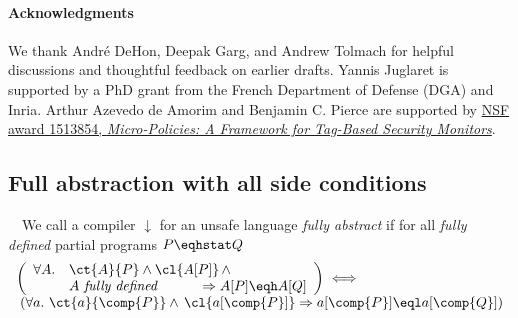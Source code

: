 \documentclass[10pt, conference, compsocconf, letterpaper, times]{IEEEtran}
\begin{document}
\ifanon\else
\paragraph*{Acknowledgments}
We thank
Andr\'e DeHon,
Deepak Garg, and
Andrew Tolmach
for helpful discussions and thoughtful feedback on earlier drafts.
Yannis Juglaret is supported by a PhD grant from the
French Department of Defense (DGA) and Inria.
Arthur Azevedo de Amorim and Benjamin C. Pierce are
supported by
\href{http://www.nsf.gov/awardsearch/showAward?AWD_ID=1513854}{NSF award 1513854,
{\em Micro-Policies: A Framework for Tag-Based Security Monitors}}.

\fi







\iffull
\appendix
\subsection{Full abstraction with all side conditions}
\label{app:fa-detail}


\begin{defn}
\label{defn:lfa-detail}~\
  We call a compiler $\downarrow$ for an unsafe language {\em fully
    abstract} if for all {\em fully defined} partial programs $P \eqhstat Q$
\[
\begin{array}{l}
\left(\begin{array}{rl}
\forall A.& \ct{A}{P} \land \cl{A[P]} \,\land\\
          &A~\textit{fully defined} \qquad\quad \Rightarrow A[P] \eqh A[Q]
\end{array}\right) \iff\\
\;(\forall a.~ \ct{a}{\comp{P}} \land\, \cl{a[\comp{P}]} \Rightarrow
  a[\comp{P}] \eql a[\comp{Q}])\\
\end{array}
\]
\end{defn}
\end{document}
